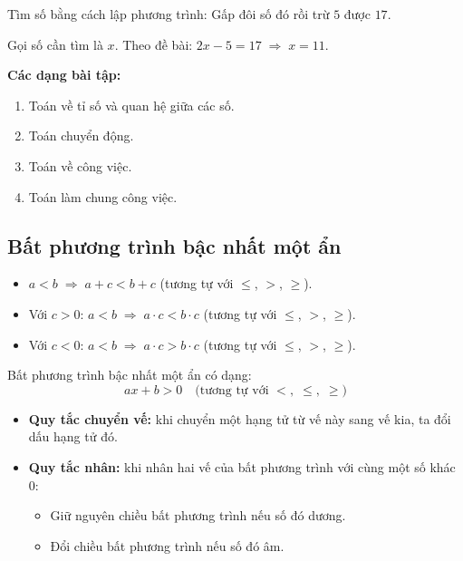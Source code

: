 \documentclass[12pt,a4paper]{article}
\begin{document}
\begin{vidu}
  Tìm số bằng cách lập phương trình: Gấp đôi số đó rồi trừ $5$ được $17$.

  Gọi số cần tìm là $x$. Theo đề bài: $2x - 5 = 17 \;\Rightarrow\; x = 11$.
\end{vidu}

\medskip\noindent\textbf{Các dạng bài tập:}
\begin{enumerate}[label=\textbf{Dạng \arabic*:}, leftmargin=*, align=left]
  \item Toán về tỉ số và quan hệ giữa các số.
  \item Toán chuyển động.
  \item Toán về công việc.
  \item Toán làm chung công việc.
\end{enumerate}

\subsection{Bất phương trình bậc nhất một ẩn}

\begin{tinhchat}[title={Liên hệ giữa thứ tự, phép cộng và phép nhân}]
  \begin{itemize}
    \item $a < b \;\Rightarrow\; a + c < b + c$ \;(tương tự với $\le$, $>$, $\ge$).
    \item Với $c > 0$: \;$a < b \;\Rightarrow\; a \cdot c < b \cdot c$ \;(tương tự với $\le$, $>$, $\ge$).
    \item Với $c < 0$: \;$a < b \;\Rightarrow\; a \cdot c > b \cdot c$ \;(tương tự với $\le$, $>$, $\ge$).
  \end{itemize}
\end{tinhchat}

\begin{dinhnghia}
  Bất phương trình bậc nhất một ẩn có dạng:
  \[ ax + b > 0 \quad \text{(tương tự với } <,\;\le,\;\ge\text{)} \]
  \begin{itemize}
    \item \textbf{Quy tắc chuyển vế:} khi chuyển một hạng tử từ vế này sang vế kia, ta đổi dấu hạng tử đó.
    \item \textbf{Quy tắc nhân:} khi nhân hai vế của bất phương trình với cùng một số khác $0$:
    \begin{itemize}
      \item Giữ nguyên chiều bất phương trình nếu số đó dương.
      \item Đổi chiều bất phương trình nếu số đó âm.
    \end{itemize}
  \end{itemize}
\end{dinhnghia}
\end{document}
